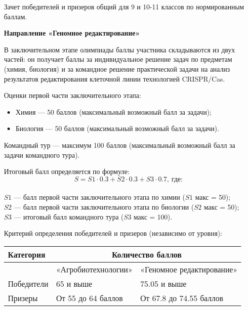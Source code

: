 Зачет победителей и призеров общий для 9 и 10-11 классов по нормированным баллам.

\textbf{Направление «Геномное редактирование»}

В заключительном этапе олимпиады баллы участника складываются из двух частей: он получает баллы за индивидуальное решение задач по предметам (химия, биология) и за командное решение практической задачи на анализ результатов редактирования клеточной линии технологией CRISPR/Cas.

Оценки первой части заключительного этапа:
\begin{itemize}
    \item Химия — 50 баллов (максимальный возможный балл за задачи);
    \item Биология — 50 баллов (максимальный возможный балл за задачи).
\end{itemize}

Командный тур — максимум 100 баллов (максимальный возможный балл за задачи командного тура).

Итоговый балл определяется по формуле: $$S = S1 \cdot 0.3 + S2 \cdot 0.3 + S3 \cdot 0.7, \: \text{где:}$$ \\
$S1$ — балл первой части заключительного этапа по химии ($S1$ макс = 50);\\
$S2$ — балл первой части заключительного этапа по биологии ($S2$ макс = 50);\\
$S3$ — итоговый балл командного тура ($S3$ макс = 100).

Критерий определения победителей и призеров (независимо от уровня):
\begin{center}
    \begin{tabular}{|l|l|l|}
        \hline
        Категория& \multicolumn{2}{|c|}{Количество баллов} \\
        \hline
        &«Агробиотехнологии»&«Геномное редактирование»\\
        \hline
        Победители&65 и выше&75.05 и выше\\
        \hline
        Призеры&От 55 до 64 баллов&От 67.8 до 74.55 баллов\\
        \hline
    \end{tabular}
\end{center}